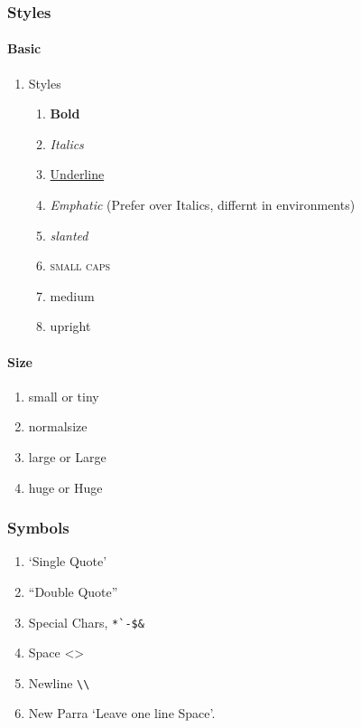 \documentclass{report}[a4paper,12pt] %
\begin{document}
\subsubsection{Styles}
\paragraph{Basic}
\begin{enumerate}
  \item Styles
  \begin{enumerate}
    \item \textbf{Bold}
    \item \textit{Italics}
    \item \underline{Underline}
    \item \emph{Emphatic} (Prefer over Italics, differnt in environments)
    \item \textsl{slanted}
    \item \textsc{small caps}
    \item \textmd{medium}
    \item \textup{upright}
  \end{enumerate}
\end{enumerate}

\paragraph{Size}
\begin{enumerate}
  \item \small small or \tiny tiny
  \item \normalsize normalsize
  \item \large large or \Large Large
  \item \huge huge or \Huge Huge
\end{enumerate}

\subsubsection{Symbols}
\begin{enumerate}
  \item `Single Quote'
  \item ``Double Quote''
  \item Special Chars, \verb|*`-$&|
  \item Space <\space>
  \item Newline \verb|\\|
  \item New Parra `Leave one line Space'.
\end{enumerate}
\end{document}
